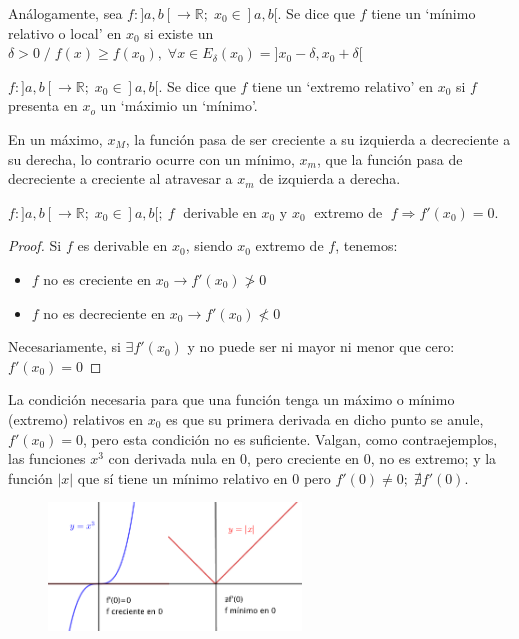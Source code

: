	\begin{defi}
		Análogamente, sea $f:]a,b[\to \mathbb R; \; x_0\in ]a,b[$. Se dice que $f$ tiene un `mínimo relativo o local' en $x_0$ si existe un $\delta>0 \; / \; f(x)\ge f(x_0), \; \forall x \in E_{\delta}(x_0)=]x_0-\delta, x_0+\delta[$
	\end{defi}

	
	\begin{defi}
	$f:]a,b[\to \mathbb R; \; x_0\in ]a,b[$. Se dice que $f$ tiene un `extremo relativo' en $x_0$ si $f$ presenta en $x_o$ un `máximio un `mínimo'.	
	\end{defi}
	
	En un máximo, $x_M$, la función pasa de ser creciente a su izquierda a decreciente a su derecha, lo contrario ocurre con un mínimo, $x_m$, que la función pasa de decreciente a creciente al atravesar a $x_m$ de izquierda a derecha.
	
	\begin{teor}
		$f:]a,b[\to \mathbb R; \; x_0\in ]a,b[;\ f\; $ derivable en $x_0$ y $x_0\; $ extremo de $\; f \Rightarrow f'(x_0)=0$.
	\end{teor}
	\begin{proof}
		Si $f$ es derivable en $x_0$, siendo $x_0$ extremo de $f$, tenemos:
		\begin{itemize}
			\item $f$ no es creciente en $x_0 \to f'(x_0)\ngtr 0$
			\item $f$ no es decreciente en $x_0 \to f'(x_0)\nless  0$
		\end{itemize}
		Necesariamente, si $\exists f'(x_0)$ y no puede ser ni mayor ni menor que cero: $f'(x_0)=0$
	\end{proof}


	La condición necesaria para que una función tenga un máximo o mínimo (extremo) relativos en $x_0$ es que su primera derivada en dicho punto se anule, $f'(x_0)=0$, pero esta condición no es suficiente. Valgan, como contraejemplos, las funciones $x^3$ con derivada nula en $0$, pero creciente en $0$, no es extremo; y la función $|x|$ que sí tiene un mínimo relativo en $0$ pero $f'(0)\neq 0; \; \nexists f'(0)$.
	
	\begin{figure}[H]
		\centering
		\includegraphics[width=0.6\textwidth]{imagenes/imagenes05/T05IM05.png}
	\end{figure}
	
